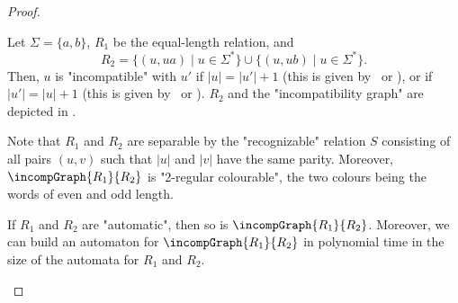 \begin{proof}
\begin{example}
    \AP\label{ex:equal-length-plusone}%
    \begin{marginfigure}%
        \centering
        \begin{tikzpicture}
            
        \end{tikzpicture}
        \caption{\AP\label{fig:equal-length-plusone-relation}%
            The relation $R_2$ of ,
            restricted to words of length at most 2.
        }
    \end{marginfigure}%
    \begin{marginfigure}%
        \centering
        \begin{tikzpicture}
            
        \end{tikzpicture}
        \caption{\AP\label{fig:equal-length-plusone-incompatibility}%
            Incompatibility graph $\incompGraph{R_1}{R_2}$ and its "2-regular colouring".%
        }
    \end{marginfigure}%
    Let $\Sigma = \{a,b\}$, $R_1$ be the equal-length relation,
    and
    \[
        R_2 = \{(u, ua) \mid u \in \Sigma^*\} \cup \{(u, ub) \mid u \in \Sigma^*\}.
    \]
    Then, $u$ is "incompatible" with $u'$ if $|u| = |u'|+1$ (this is given by \compL~or \compR),
    or if $|u'| = |u|+1$ (this is given by \compLpr~or \compRpr).
    $R_2$ and the "incompatibility graph" are depicted in .
    
    Note that $R_1$ and $R_2$ are separable by the "recognizable" relation
    $S$ consisting of all pairs $(u,v)$ such that $|u|$ and $|v|$ have the same parity.
    Moreover, $\incompGraph{R_1}{R_2}$ is "2-regular colourable", the two colours being
    the words of even and odd length.
\end{example}

\begin{lemma}
    \AP\label{lem:incomp-is-automatic}
    If $R_1$ and $R_2$ are "automatic", then so is $\incompGraph{R_1}{R_2}$.
    Moreover, we can build an automaton for $\incompGraph{R_1}{R_2}$ in polynomial time in the size of the automata for $R_1$ and $R_2$.
\end{lemma}


\end{proof}
